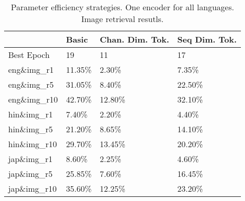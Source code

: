 \begin{table}
    \centering
    \begin{tabular}{llll}
    \toprule
    {} & Basic & Chan. Dim. Tok. & Seq Dim. Tok. \\
    \midrule
    Best Epoch          &                     19 &                        11 &                            17 \\
    eng\&img\_r1  &                 11.35\% &                     2.30\% &                         7.35\% \\
    eng\&img\_r5  &                 31.05\% &                     8.40\% &                        22.50\% \\
    eng\&img\_r10 &                 42.70\% &                    12.80\% &                        32.10\% \\
    hin\&img\_r1  &                  7.40\% &                     2.20\% &                         4.40\% \\
    hin\&img\_r5  &                 21.20\% &                     8.65\% &                        14.10\% \\
    hin\&img\_r10 &                 29.70\% &                    13.45\% &                        20.20\% \\
    jap\&img\_r1  &                  8.60\% &                     2.25\% &                         4.60\% \\
    jap\&img\_r5  &                 25.85\% &                     7.60\% &                        16.45\% \\
    jap\&img\_r10 &                 35.60\% &                    12.25\% &                        23.20\% \\
    \bottomrule
    \end{tabular}
\caption{Parameter efficiency strategies. One encoder for all languages. Image retrieval resutls.}
\label{table:param_eff_img_ret}
\end{table}
